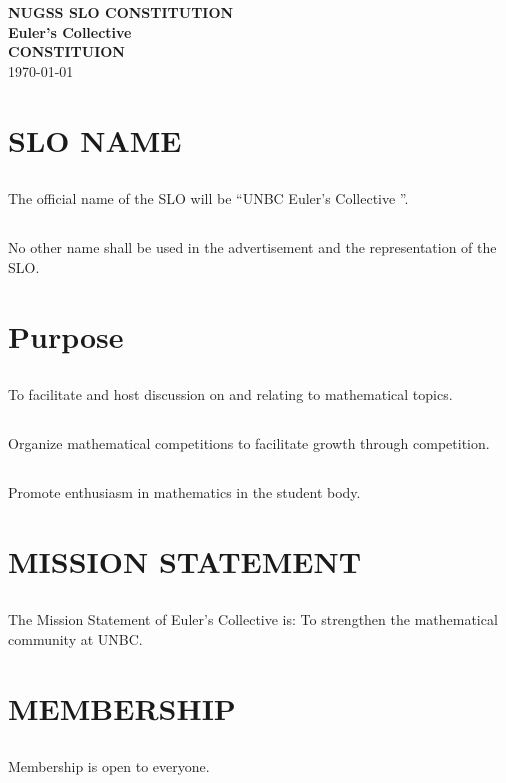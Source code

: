 \documentclass{article}
\def\SLOname{Euler's Collective }
\def\title{\textbf{NUGSS SLO CONSTITUTION}\\ \textbf{\SLOname}\\\textbf{CONSTITUION}\\\today}
\begin{document}
{
	\large
	\begin{center}
\title
\end{center}
}

\section{SLO NAME}
\subsection{}
The official name of the SLO will be \enquote{UNBC \SLOname}.

\subsection{}
No other name shall be used in the advertisement and the representation of the SLO.

\section{Purpose}
\subsection{}
To facilitate and host discussion on and relating to mathematical topics.
\subsection{}
Organize mathematical competitions to facilitate growth through competition.
\subsection{}
Promote enthusiasm in mathematics in the student body.
\section{MISSION STATEMENT}
\subsection{}
The Mission Statement of \SLOname  is:
To strengthen the mathematical community at UNBC.
\section{MEMBERSHIP}
\subsection{}
Membership is open to everyone.
\end{document}
